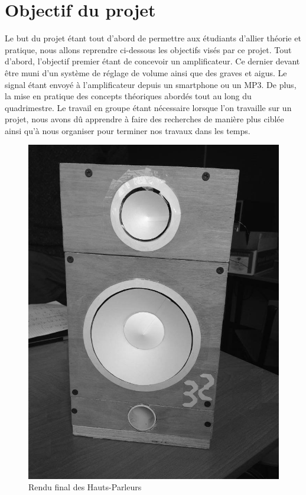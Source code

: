 \section{Objectif du projet}

Le but du projet étant  tout d’abord de permettre aux étudiants d’allier théorie et pratique, nous allons reprendre ci-dessous les objectifs visés par ce projet.
Tout d’abord,  l’objectif premier étant de concevoir un amplificateur. Ce dernier  devant être muni d’un système de réglage de volume ainsi que des graves et aigus. Le signal étant envoyé à l’amplificateur depuis un smartphone ou un MP3.  De plus, la mise en pratique des concepts théoriques abordés tout au long du quadrimestre.
Le travail en groupe étant nécessaire lorsque l’on travaille sur un projet, nous avons dû apprendre  à faire des recherches  de manière plus ciblée ainsi qu’à nous organiser pour terminer nos travaux dans les temps.

\begin{figure}	
\begin{center}
\includegraphics[scale=0.5]{img/PhotoHP} 
\end{center}
\caption{Rendu final des Hauts-Parleurs}		
\label{fig:PhotoHP}		
\end{figure}